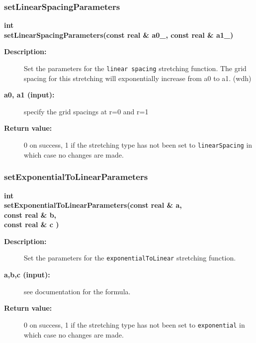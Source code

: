 \subsubsection{setLinearSpacingParameters}
 
\begin{flushleft} \textbf{%
int  \\ 
\settowidth{\StretchMappingIncludeArgIndent}{setLinearSpacingParameters(}%
setLinearSpacingParameters(const real \& a0\_, const real \& a1\_)
}\end{flushleft}
\begin{description}
\item[{\bf Description:}]  
    Set the parameters for the {\tt linear spacing} stretching
   function. 
    The grid spacing for this stretching will exponentially increase from a0 to a1. (wdh)
\item[{\bf a0, a1 (input):}]  specify the grid spacings at r=0 and r=1
\item[{\bf Return value:}]  0 on success, 1 if the stretching type has not been set to {\tt linearSpacing}
   in which case no changes are made.  
\end{description}
\subsubsection{setExponentialToLinearParameters}
 
\begin{flushleft} \textbf{%
int  \\ 
\settowidth{\StretchMappingIncludeArgIndent}{setExponentialToLinearParameters(}%
setExponentialToLinearParameters(const real \& a, \\ 
\hspace{\StretchMappingIncludeArgIndent}const real \& b,\\ 
\hspace{\StretchMappingIncludeArgIndent}const real \& c )
}\end{flushleft}
\begin{description}
\item[{\bf Description:}]  
    Set the parameters for the {\tt exponentialToLinear} stretching
   function.
\item[{\bf a,b,c (input):}]  see documentation for the formula.
\item[{\bf Return value:}]  0 on success, 1 if the stretching type has not been set to {\tt exponential}
   in which case no changes are made.  
\end{description}
